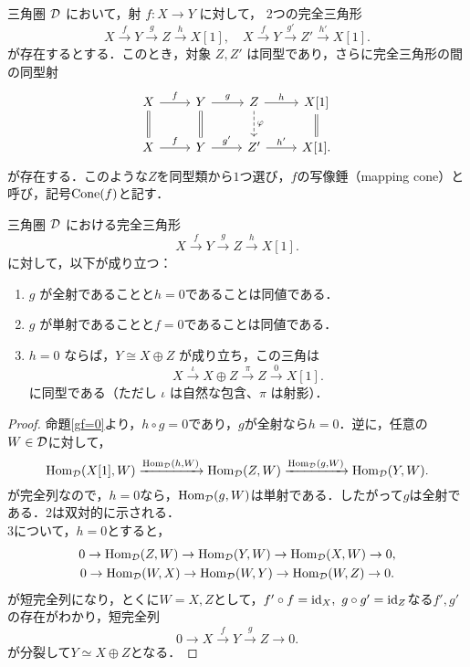 \begin{cor}\cite[p.246]{KS06}
三角圏 ${\mathcal D}$ において，射 $f \colon X \to Y$ に対して，
2つの完全三角形
\[
X \xrightarrow{f} Y \xrightarrow{g} Z \xrightarrow{h} X[1], \quad
X \xrightarrow{f} Y \xrightarrow{g'} Z' \xrightarrow{h'} X[1].
\]
が存在するとする．このとき，対象 $Z, Z'$ は同型であり，さらに完全三角形の間の同型射
\[
\begin{tikzcd}
X \arrow{r}{f} \arrow[equal]{d} & Y \arrow{r}{g} \arrow[equal]{d} & Z \arrow{r}{h} \arrow[dashed]{d}{\varphi} & X[1] \arrow[equal]{d} \\
X \arrow{r}{f} & Y \arrow{r}{g'} & Z' \arrow{r}{h'} & X[1].
\end{tikzcd}
\]
が存在する．このような$Z$を同型類から$1$つ選び，$f$の写像錘（mapping cone）と呼び，記号$\operatorname{\mathrm{Cone}}(f)$と記す．
\end{cor}

\begin{cor}
三角圏 ${\mathcal D}$ における完全三角形
\[
X \xrightarrow{f} Y \xrightarrow{g} Z \xrightarrow{h} X[1].
\]
に対して，以下が成り立つ：

\begin{enumerate}
  \item $g$ が全射であることと$h = 0$であることは同値である．
  \item $g$ が単射であることと$f = 0$であることは同値である．
  \item $h = 0$ ならば，$Y \cong X \oplus Z$ が成り立ち，この三角は
  \[
  X \xrightarrow{\iota} X \oplus Z \xrightarrow{\pi} Z \xrightarrow{0} X[1].
  \]
  に同型である（ただし $\iota$ は自然な包含、$\pi$ は射影）．
\end{enumerate}
\end{cor}
\begin{proof}
	命題\ref{gf=0}より，$h\circ g = 0$であり，$g$が全射なら$h=0$．逆に，任意の$W\in{\mathcal D}$に対して，
\[
	\operatorname{\mathrm{Hom}}_{{\mathcal D}}(X[1],W)\xrightarrow{\operatorname{\mathrm{Hom}}_{{\mathcal D}}(h,W)}\operatorname{\mathrm{Hom}}_{{\mathcal D}}(Z,W)\xrightarrow{\operatorname{\mathrm{Hom}}_{{\mathcal D}}(g,W)}\operatorname{\mathrm{Hom}}_{{\mathcal D}}(Y,W).
\]	
が完全列なので，$h=0$なら，$\operatorname{\mathrm{Hom}}_{{\mathcal D}}(g,W)$は単射である．したがって$g$は全射である．2は双対的に示される．\\
3について，$h=0$とすると，
\begin{gather*}
	0\rightarrow\operatorname{\mathrm{Hom}}_{{\mathcal D}}(Z,W)\rightarrow\operatorname{\mathrm{Hom}}_{{\mathcal D}}(Y,W)\rightarrow\operatorname{\mathrm{Hom}}_{{\mathcal D}}(X,W)\rightarrow 0,\\
	0\rightarrow\operatorname{\mathrm{Hom}}_{{\mathcal D}}(W,X)\rightarrow\operatorname{\mathrm{Hom}}_{{\mathcal D}}(W,Y)\rightarrow\operatorname{\mathrm{Hom}}_{{\mathcal D}}(W,Z)\rightarrow 0.
\end{gather*}
が短完全列になり，とくに$W=X,Z$として，$f'\circ f =\mathrm{id}_X,\ g\circ g'=\mathrm{id}_Z$なる$f',g'$の存在がわかり，短完全列
\[
0\rightarrow X \xrightarrow{f} Y \xrightarrow{g} Z\rightarrow 0 .
\]
が分裂して$Y\simeq X\oplus Z$となる．
\end{proof}

